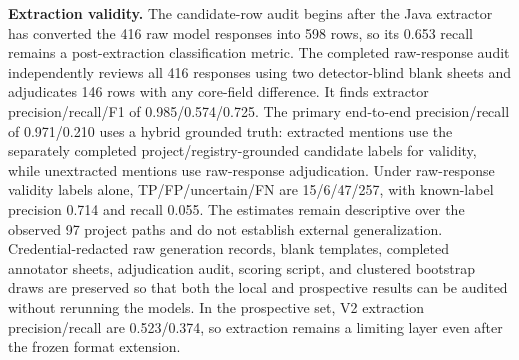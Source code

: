 \documentclass[pdflatex,sn-basic]{sn-jnl}
\begin{document}
\textbf{Extraction validity.} The candidate-row audit begins after the Java extractor has converted the 416 raw model responses into 598 rows, so its 0.653 recall remains a post-extraction classification metric. The completed raw-response audit independently reviews all 416 responses using two detector-blind blank sheets and adjudicates 146 rows with any core-field difference. It finds extractor precision/recall/F1 of 0.985/0.574/0.725. The primary end-to-end precision/recall of 0.971/0.210 uses a hybrid grounded truth: extracted mentions use the separately completed project/registry-grounded candidate labels for validity, while unextracted mentions use raw-response adjudication. Under raw-response validity labels alone, TP/FP/uncertain/FN are 15/6/47/257, with known-label precision 0.714 and recall 0.055. The estimates remain descriptive over the observed 97 project paths and do not establish external generalization. Credential-redacted raw generation records, blank templates, completed annotator sheets, adjudication audit, scoring script, and clustered bootstrap draws are preserved so that both the local and prospective results can be audited without rerunning the models. In the prospective set, V2 extraction precision/recall are 0.523/0.374, so extraction remains a limiting layer even after the frozen format extension.
\end{document}
